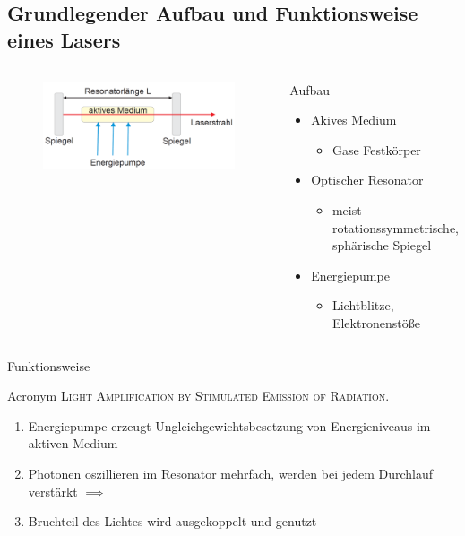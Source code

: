 \documentclass[10pt, aspectratio=169]{beamer}
\begin{document}
\subsection{Grundlegender Aufbau und Funktionsweise eines Lasers}
\label{sec:funkt}
\begin{frame}
  \begin{columns}
    \begin{figure}[H]\centering
      \includegraphics[width=\columnwidth]{schema.png}
    \end{figure}

    \begin{block}{Aufbau}
      \begin{itemize}
      \item Akives Medium
        \begin{itemize}
        \item Gase Festk\"orper
        \end{itemize}
      \item Optischer Resonator
        \begin{itemize}
        \item meist rotationssymmetrische, sph\"arische Spiegel
        \end{itemize}
      \item Energiepumpe
        \begin{itemize}
        \item Lichtblitze, Elektronenst\"oße
        \end{itemize}
      \end{itemize}
    \end{block}
  \end{columns}
\end{frame}

\begin{frame}{Funktionsweise}
  \begin{block}{Acronym}
    \textsc{Light Amplification by Stimulated Emission of Radiation.}
  \end{block}

  \begin{enumerate}
  \item<1-> Energiepumpe erzeugt Ungleichgewichtsbesetzung von
    Energieniveaus im aktiven Medium
  \item<2-> Photonen oszillieren im Resonator mehrfach, werden bei
    jedem Durchlauf verst\"arkt \(\implies\)
  \item<3-> Bruchteil des Lichtes wird ausgekoppelt und genutzt
  \end{enumerate}
\end{frame}
\end{document}
